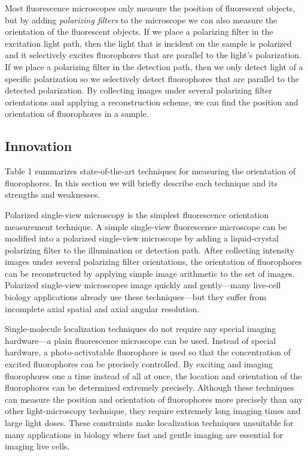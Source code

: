 \documentclass[12pt]{article}
\begin{document}
Most fluorescence microscopes only measure the position of fluorescent objects,
but by adding \textit{polarizing filters} to the microscope we can also measure
the orientation of the fluorescent objects. If we place a polarizing filter in
the excitation light path, then the light that is incident on the sample is
polarized and it selectively excites fluorophores that are parallel to the
light's polarization. If we place a polarizing filter in the detection path,
then we only detect light of a specific polarization so we selectively detect
fluorophores that are parallel to the detected polarization. By collecting
images under several polarizing filter orientations and applying a
reconstruction scheme, we can find the position and orientation of fluorophores
in a sample.

\subsection*{Innovation}
Table 1 summarizes state-of-the-art techniques for measuring the orientation of
fluorophores. In this section we will briefly describe each technique and its
strengths and weaknesses. 

Polarized single-view microscopy \cite{demay2011} is the simplest fluorescence
orientation measurement technique. A simple single-view fluorescence microscope
can be modified into a polarized single-view microscope by adding a
liquid-crystal polarizing filter to the illumination or detection path. After
collecting intensity images under several polarizing filter orientations, the
orientation of fluorophores can be reconstructed by applying simple image
arithmetic to the set of images. Polarized single-view microscopes image quickly
and gently---many live-cell biology applications already use these
techniques---but they suffer from incomplete axial spatial and axial angular
resolution.

Single-molecule localization techniques do not require any special imaging
hardware---a plain fluorescence microscope can be used. Instead of special
hardware, a photo-activatable fluorophore is used so that the concentration of
excited fluorophores can be precisely controlled. By exciting and imaging
fluorophores one a time instead of all at once, the location and orientation of
the fluorophores can be determined extremely precisely. Although these techniques
can measure the position and orientation of fluorophores more precisely than any
other light-microscopy technique, they require extremely long imaging times and
large light doses. These constraints make localization techniques unsuitable for
many applications in biology where fast and gentle imaging are essential for
imaging live cells.
\end{document}
